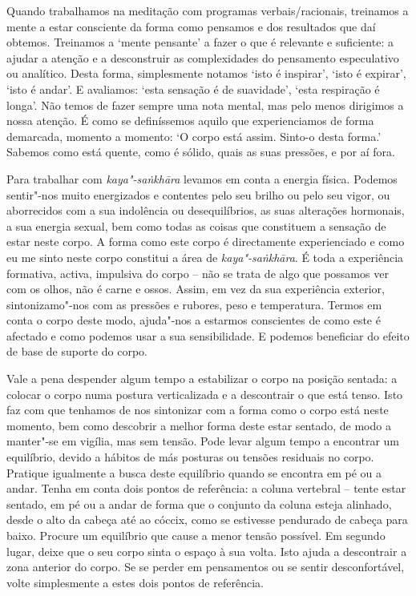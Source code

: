 Quando trabalhamos na meditação com programas verbais/racionais, treinamos a
mente a estar consciente da forma como pensamos e dos resultados que daí
obtemos. Treinamos a `mente pensante' a fazer o que é relevante e suficiente: a
ajudar a atenção e a desconstruir as complexidades do pensamento especulativo ou
analítico. Desta forma, simplesmente notamos `isto é inspirar', `isto é
expirar', `isto é andar'. E avaliamos: `esta sensação é de suavidade', `esta
respiração é longa'. Não temos de fazer sempre uma nota mental, mas pelo menos
dirigimos a nossa atenção. É como se definíssemos aquilo que experienciamos de
forma demarcada, momento a momento: `O corpo está assim. Sinto-o desta forma.'
Sabemos como está quente, como é sólido, quais as suas pressões, e por aí fora.

Para trabalhar com \emph{kaya"-saṅkhāra} levamos em conta a energia física.
Podemos sentir"-nos muito energizados e contentes pelo seu brilho ou pelo seu
vigor, ou aborrecidos com a sua indolência ou desequilíbrios, as suas alterações
hormonais, a sua energia sexual, bem como todas as coisas que constituem a
sensação de estar neste corpo. A forma como este corpo é directamente
experienciado e como eu me sinto neste corpo constitui a área de
\emph{kaya"-saṅkhāra}. É toda a experiência formativa, activa, impulsiva do corpo
-- não se trata de algo que possamos ver com os olhos, não é carne e ossos.
Assim, em vez da sua experiência exterior, sintonizamo"-nos com as pressões e
rubores, peso e temperatura. Termos em conta o corpo deste modo, ajuda"-nos a
estarmos conscientes de como este é afectado e como podemos usar a sua
sensibilidade. E podemos beneficiar do efeito de base de suporte do corpo.

Vale a pena despender algum tempo a estabilizar o corpo na posição sentada: a
colocar o corpo numa postura verticalizada e a descontrair o que está tenso.
Isto faz com que tenhamos de nos sintonizar com a forma como o corpo está neste
momento, bem como descobrir a melhor forma deste estar sentado, de modo a
manter"-se em vigília, mas sem tensão. Pode levar algum tempo a encontrar um
equilíbrio, devido a hábitos de más posturas ou tensões residuais no corpo.
Pratique igualmente a busca deste equilíbrio quando se encontra em pé ou a
andar. Tenha em conta dois pontos de referência: a coluna vertebral -- tente
estar sentado, em pé ou a andar de forma que o conjunto da coluna esteja
alinhado, desde o alto da cabeça até ao cóccix, como se estivesse pendurado de
cabeça para baixo. Procure um equilíbrio que cause a menor tensão possível. Em
segundo lugar, deixe que o seu corpo sinta o espaço à sua volta. Isto ajuda a
descontrair a zona anterior do corpo. Se se perder em pensamentos ou se sentir
desconfortável, volte simplesmente a estes dois pontos de referência.

